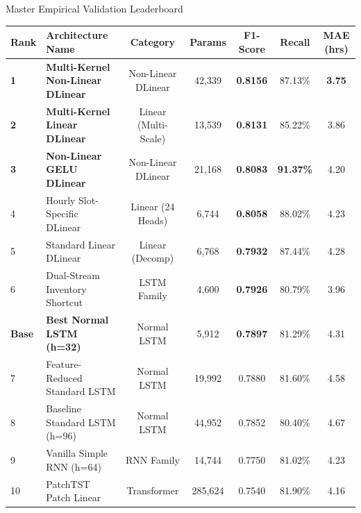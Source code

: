 \documentclass[10pt, aspectratio=169]{beamer}
\begin{document}
\begin{frame}{Master Empirical Validation Leaderboard}
  \centering
  \small
  \begin{tabular}{llccccc}
    \toprule
    \textbf{Rank} & \textbf{Architecture Name} & \textbf{Category} & \textbf{Params} & \textbf{F1-Score} & \textbf{Recall} & \textbf{MAE (hrs)} \\
    \midrule
    \rowcolor{green!15} \textbf{1} & \textbf{Multi-Kernel Non-Linear DLinear} & Non-Linear DLinear & 42,339 & \textbf{0.8156} & 87.13\% & \textbf{3.75} \\
    \rowcolor{green!10} \textbf{2} & \textbf{Multi-Kernel Linear DLinear} & Linear (Multi-Scale) & 13,539 & \textbf{0.8131} & 85.22\% & 3.86 \\
    \rowcolor{green!5} \textbf{3} & \textbf{Non-Linear GELU DLinear} & Non-Linear DLinear & 21,168 & \textbf{0.8083} & \textbf{91.37\%} & 4.20 \\
    4 & Hourly Slot-Specific DLinear & Linear (24 Heads) & 6,744 & \textbf{0.8058} & 88.02\% & 4.23 \\
    5 & Standard Linear DLinear & Linear (Decomp) & 6,768 & \textbf{0.7932} & 87.44\% & 4.28 \\
    6 & Dual-Stream Inventory Shortcut & LSTM Family & 4,600 & \textbf{0.7926} & 80.79\% & 3.96 \\
    \rowcolor{blue!10} \textbf{Base} & \textbf{Best Normal LSTM (h=32)} & Normal LSTM & 5,912 & \textbf{0.7897} & 81.29\% & 4.31 \\
    7 & Feature-Reduced Standard LSTM & Normal LSTM & 19,992 & 0.7880 & 81.60\% & 4.58 \\
    8 & Baseline Standard LSTM (h=96) & Normal LSTM & 44,952 & 0.7852 & 80.40\% & 4.67 \\
    9 & Vanilla Simple RNN (h=64) & RNN Family & 14,744 & 0.7750 & 81.02\% & 4.23 \\
    10 & PatchTST Patch Linear & Transformer & 285,624 & 0.7540 & 81.90\% & 4.16 \\
    \bottomrule
  \end{tabular}
\end{frame}
\end{document}
